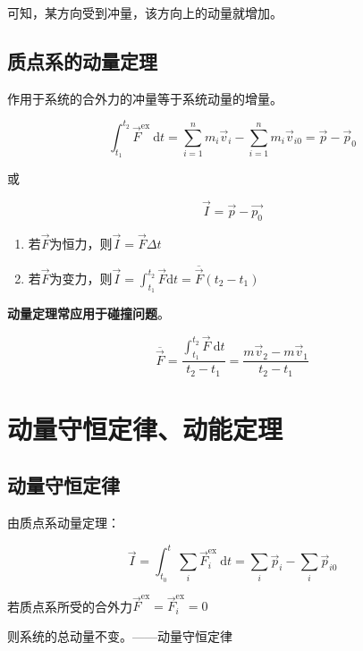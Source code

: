 \documentclass[
	12pt, %
	a4paper, %
]{myLegrandOrangeBook}
\newcommand{\rmd}{\mathrm{d}}
\begin{document}
可知，某方向受到冲量，该方向上的动量就增加。

\subsection{质点系的动量定理}

作用于系统的合外力的冲量等于系统动量的增量。

\begin{equation}
    \int_{t_1}^{t_2} \overrightarrow{F}^{\mathrm{ex}} \mathrm{~d} t=
    \sum_{i=1}^n m_i \overrightarrow{v}_i-\sum_{i=1}^n m_i \overrightarrow{v}_{i 0}
    =\overrightarrow{p}-\overrightarrow{p}_0
\end{equation}

或

\[
    \overrightarrow{I} = \overrightarrow{p} - \overrightarrow{p_{0}}
\]

\begin{enumerate}
    \item 若\(\overrightarrow{F}\)为恒力，则\(\overrightarrow{I} = \overrightarrow{F} \Delta t\)
    \item 若\(\overrightarrow{F}\)为变力，则\(\overrightarrow{I} =
        \int_{t_1}^{t_2} \overrightarrow{F} \rmd t = \overline{\overrightarrow{F}}\left(t_2-t_1\right)\)
\end{enumerate}

\textbf{动量定理常应用于碰撞问题}。

$$
\overline{\overrightarrow{F}}=\frac{\int_{t_1}^{t_2} \overrightarrow{F} \mathrm{~d} t}{t_2-t_1}
=\frac{m \overrightarrow{v}_2-m \overrightarrow{v}_1}{t_2-t_1}
$$

\section{动量守恒定律、动能定理}

\subsection{动量守恒定律}

由质点系动量定理：

$$
    \overrightarrow{I}=\int_{t_0}^t \sum_i \overrightarrow{F}_i^{\mathrm{ex}} \mathrm{~d} t=
    \sum_i \overrightarrow{p}_i-\sum_i \overrightarrow{p}_{i 0}
$$

若质点系所受的合外力\(\overrightarrow{F}^{\mathrm{ex}} = \overrightarrow{F}_i^{\mathrm{ex}}= 0\)

则系统的总动量不变。——动量守恒定律
\end{document}
